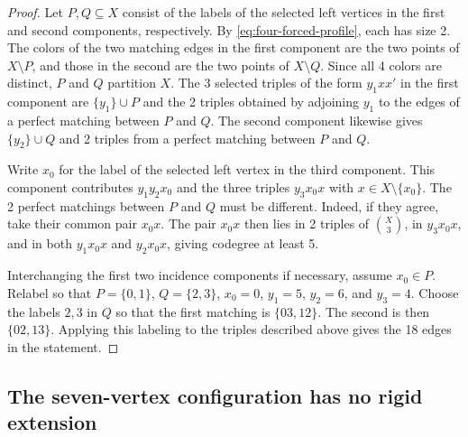 \documentclass[10pt]{article}
\numberwithin{equation}{section}
\theoremstyle{definition}
\begin{document}
\begin{proof}
Let $P,Q\subseteq X$ consist of the labels of the selected left vertices in the first and second components, respectively. By \cref{eq:four-forced-profile}, each has size 2. The colors of the two matching edges in the first component are the two points of $X\setminus P$, and those in the second are the two points of $X\setminus Q$. Since all 4 colors are distinct, $P$ and $Q$ partition $X$. The 3 selected triples of the form $y_1xx'$ in the first component are $\{y_1\}\cup P$ and the 2 triples obtained by adjoining $y_1$ to the edges of a perfect matching between $P$ and $Q$. The second component likewise gives $\{y_2\}\cup Q$ and 2 triples from a perfect matching between $P$ and $Q$.

Write $x_0$ for the label of the selected left vertex in the third component. This component contributes $y_1y_2x_0$ and the three triples $y_3x_0x$ with $x\in X\setminus\{x_0\}$. The 2 perfect matchings between $P$ and $Q$ must be different. Indeed, if they agree, take their common pair $x_0x$. The pair $x_0x$ then lies in 2 triples of $\binom X3$, in $y_3x_0x$, and in both $y_1x_0x$ and $y_2x_0x$, giving codegree at least 5.

Interchanging the first two incidence components if necessary, assume $x_0\in P$. Relabel so that $P=\{0,1\}$, $Q=\{2,3\}$, $x_0=0$, $y_1=5$, $y_2=6$, and $y_3=4$. Choose the labels $2,3$ in $Q$ so that the first matching is $\{03,12\}$. The second is then $\{02,13\}$. Applying this labeling to the triples described above gives the 18 edges in the statement.
\end{proof}

\subsection{The seven-vertex configuration has no rigid extension}
\end{document}
